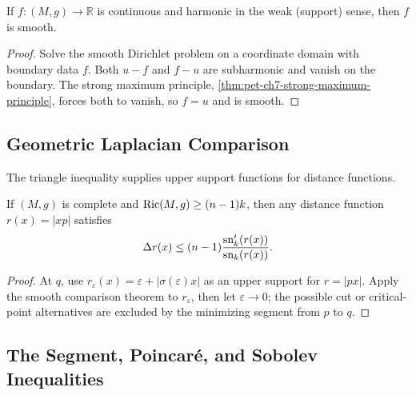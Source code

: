 \begin{theorem}
  \label{thm:pet-ch7-harmonic-regularity}

  If $f:(M,g)\to\mathbb{R}$ is continuous and harmonic in the weak (support) sense,
  then $f$ is smooth.
\end{theorem}
\begin{proof}
  \sketch
  Solve the smooth Dirichlet problem on a coordinate domain with boundary data \(f\). Both \(u-f\) and \(f-u\) are subharmonic and vanish on the boundary. The strong maximum principle, \cref{thm:pet-ch7-strong-maximum-principle}, forces both to vanish, so \(f=u\) and is smooth.
\end{proof}

\subsection{Geometric Laplacian Comparison}

The triangle inequality supplies upper support functions for distance
functions.

\begin{lemma}
  \label{lem:pet-ch7-laplacian-comparison-calabi}

  If $(M,g)$ is complete and $\operatorname{Ric}(M,g)\ge(n-1)k$, then any distance function
  $r(x)=|xp|$ satisfies
  \[
    \Delta r(x)\le(n-1)\frac{\mathrm{sn}_k'(r(x))}{\mathrm{sn}_k(r(x))}.
  \]
\end{lemma}
\begin{proof}
  \sketch
  At \(q\), use \(r_\varepsilon(x)=\varepsilon+|\sigma(\varepsilon)x|\) as an upper support for \(r=|px|\). Apply the smooth comparison theorem to \(r_\varepsilon\), then let \(\varepsilon\to0\); the possible cut or critical-point alternatives are excluded by the minimizing segment from \(p\) to \(q\).
\end{proof}

\subsection{The Segment, Poincaré, and Sobolev Inequalities}

